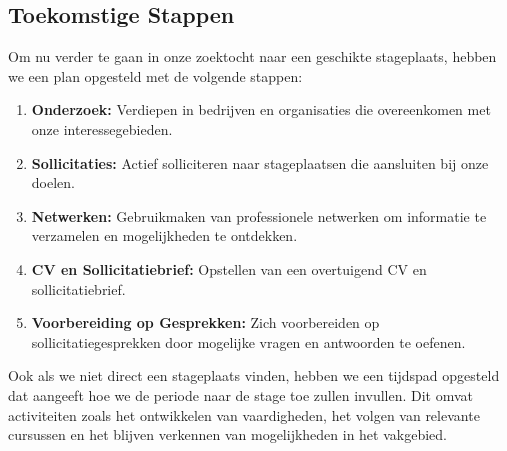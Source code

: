 \subsection{Toekomstige Stappen}

Om nu verder te gaan in onze zoektocht naar een geschikte stageplaats, hebben we een plan opgesteld met de volgende stappen:

\begin{enumerate}
    \item \textbf{Onderzoek:} Verdiepen in bedrijven en organisaties die overeenkomen met onze interessegebieden.
    \item \textbf{Sollicitaties:} Actief solliciteren naar stageplaatsen die aansluiten bij onze doelen.
    \item \textbf{Netwerken:} Gebruikmaken van professionele netwerken om informatie te verzamelen en mogelijkheden te ontdekken.
    \item \textbf{CV en Sollicitatiebrief:} Opstellen van een overtuigend CV en sollicitatiebrief.
    \item \textbf{Voorbereiding op Gesprekken:} Zich voorbereiden op sollicitatiegesprekken door mogelijke vragen en antwoorden te oefenen.
\end{enumerate}

Ook als we niet direct een stageplaats vinden, hebben we een tijdspad opgesteld dat aangeeft hoe we de periode naar de stage toe zullen invullen. Dit omvat activiteiten zoals het ontwikkelen van vaardigheden, het volgen van relevante cursussen en het blijven verkennen van mogelijkheden in het vakgebied.
